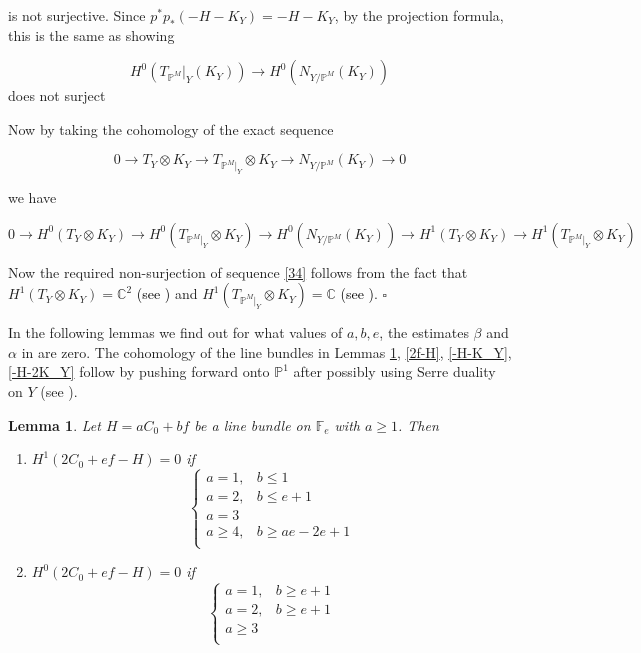 \documentclass[11pt,twoside]{amsart}
\theoremstyle{plain}
\numberwithin{equation}{section}
\newtheorem{lemma}[theorem]{Lemma}
\theoremstyle{definition}
\newcommand*{\QEDB}{\hfill\ensuremath{\square}}
\begin{document}
is not surjective. Since $p^*p_*(-H-K_Y) = -H-K_Y$, by the projection formula, this is the same as showing 

\begin{equation}\label{34}
   H^0(T_{\mathbb{P}^M}|_Y(K_Y)) \to H^0(N_{Y/\mathbb{P}^M}(K_Y)) 
\end{equation}
does not surject

Now by taking the cohomology of the exact sequence 

$$0 \to T_Y \otimes K_Y \to T_{\mathbb{P}^M|_Y} \otimes K_Y \to N_{Y/\mathbb{P}^M}(K_Y) \to 0$$


we have 

$$0 \to H^0(T_Y \otimes K_Y) \to H^0(T_{\mathbb{P}^M|_Y} \otimes K_Y) \to H^0(N_{Y/\mathbb{P}^M}(K_Y)) \to H^1(T_Y \otimes K_Y) \to H^1(T_{\mathbb{P}^M|_Y} \otimes K_Y)$$

Now the required non-surjection of sequence \ref{34} follows from the fact that $H^1(T_Y \otimes K_Y) = \mathbb{C}^2$ \textcolor{black}{(see \cite[Lemma $2.6$, (iii)]{BMR21})} and $H^1(T_{\mathbb{P}^M|_Y} \otimes K_Y) = \mathbb{C}$ \textcolor{black}{(see \cite[Lemma $2.5$, (iii)]{BMR21})}. \QEDB

In the following lemmas we find out for what values of $a, b, e$, the estimates $\beta$ and $\alpha$ in  are zero. The cohomology of the line bundles in Lemmas \ref{2C_0+ef-H}, \ref{2f-H}, \ref{-H-K_Y}, \ref{-H-2K_Y} follow by pushing forward onto $\mathbb{P}^1$ after possibly using Serre duality on $Y$ (see \cite[III, Ex $8.4$]{Hartshorne}).


\begin{lemma}\label{2C_0+ef-H}
Let $H = aC_0+bf$ be a line bundle on $\mathbb{F}_e$ with $a \geq 1$. Then 
\begin{enumerate}
    \item[(1)] $H^1(2C_0+ef-H) = 0$ if 
\[
\begin{cases}
   a = 1, & b \leq 1  \\
   a = 2, & b \leq e+1 \\
   a = 3 & \\
   a \geq 4, & b \geq ae-2e+1 \\
\end{cases}
\]

\item[(2)] $H^0(2C_0+ef-H) = 0$ if 
\[
\begin{cases}
   a = 1, & b \geq e+1  \\
   a = 2, & b \geq e+1 \\
   a \geq 3 & \\
\end{cases}
\] 

\end{enumerate}

    
\end{lemma}
\end{document}
